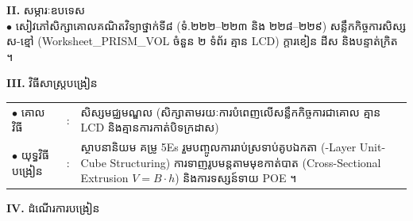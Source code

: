 \documentclass[a4paper,10pt]{article}
\newcommand{\en}[1]{{\TimesEn #1}}
\begin{document}
{\vspace{2pt}

\textbf{II.} {\muol សម្ភារៈឧបទេស}\\[1pt]
\hspace*{0.55cm}$\bullet$ \hspace{0.35cm} សៀវភៅសិក្សាគោលគណិតវិទ្យាថ្នាក់ទី៨ (ទំ.២២២--២២៣ និង ២២៨--២២៩) សន្លឹកកិច្ចការសិស្ស ស-ខ្មៅ (\en{Worksheet\_PRISM\_VOL} ចំនួន ២ ទំព័រ គ្មាន \en{LCD}) ក្ដារខៀន ដីស និងបន្ទាត់ក្រិត ។

\vspace{2pt}

\textbf{III.} {\muol វិធីសាស្រ្តបង្រៀន}\\[1pt]
\hspace*{0.45cm}%
\begin{tabular}{@{}l l L{14.85cm}@{}}
  $\bullet$ \hspace{0.25cm} គោលវិធី & : & សិស្សមជ្ឈមណ្ឌល (សិក្សាតាមរយៈការបំពេញលើសន្លឹកកិច្ចការជាគោល គ្មាន \en{LCD} និងគ្មានការកាត់បិទក្រដាស) \\
  $\bullet$ \hspace{0.25cm} យុទ្ធវិធីបង្រៀន & : & ស្ថាបនានិយម គម្រូ \en{5Es} រួមបញ្ចូលការរាប់ស្រទាប់គូបឯកតា (\en{3-Layer Unit-Cube Structuring}) ការទាញរូបមន្តតាមមុខកាត់បាត (\en{Cross-Sectional Extrusion} $V=B\cdot h$) និងការទស្សន៍ទាយ \en{POE} ។ \\
\end{tabular}
}

\vspace{2pt}

\textbf{IV.} {\muol ដំណើរការបង្រៀន}

\vspace{1pt}
\end{document}
